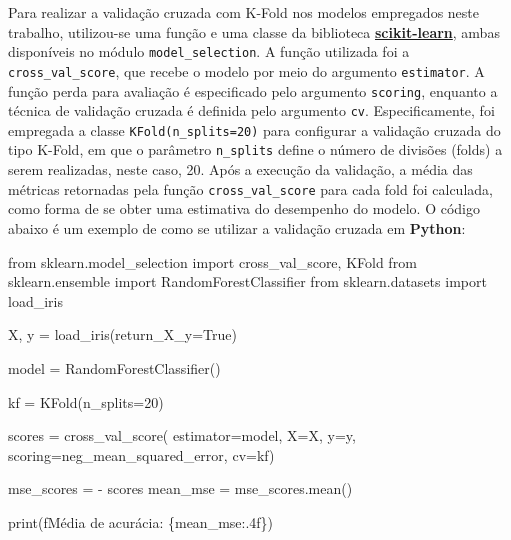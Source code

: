 \documentclass[
  12pt,
  a4paper,
]{scrreprt}
\newenvironment{Shaded}{}{}
\newcommand{\BuiltInTok}[1]{\textcolor[rgb]{0.84,0.23,0.29}{#1}}
\newcommand{\DecValTok}[1]{\textcolor[rgb]{0.00,0.36,0.77}{#1}}
\newcommand{\ImportTok}[1]{\textcolor[rgb]{0.01,0.18,0.38}{#1}}
\newcommand{\NormalTok}[1]{\textcolor[rgb]{0.14,0.16,0.18}{#1}}
\newcommand{\OperatorTok}[1]{\textcolor[rgb]{0.14,0.16,0.18}{#1}}
\newcommand{\SpecialCharTok}[1]{\textcolor[rgb]{0.00,0.36,0.77}{#1}}
\newcommand{\SpecialStringTok}[1]{\textcolor[rgb]{0.01,0.18,0.38}{#1}}
\newcommand{\StringTok}[1]{\textcolor[rgb]{0.01,0.18,0.38}{#1}}
\newcommand{\VariableTok}[1]{\textcolor[rgb]{0.89,0.38,0.04}{#1}}
\begin{document}
\vspace{12pt}

Para realizar a validação cruzada com K-Fold nos modelos empregados
neste trabalho, utilizou-se uma função e uma classe da biblioteca
\href{https://scikit-learn.org/stable/}{\textbf{scikit-learn}}, ambas
disponíveis no módulo \texttt{model\_selection}. A função utilizada foi
a \texttt{cross\_val\_score}, que recebe o modelo por meio do argumento
\texttt{estimator}. A função perda para avaliação é especificado pelo
argumento \texttt{scoring}, enquanto a técnica de validação cruzada é
definida pelo argumento \texttt{cv}. Especificamente, foi empregada a
classe \texttt{KFold(n\_splits=20)} para configurar a validação cruzada
do tipo K-Fold, em que o parâmetro \texttt{n\_splits} define o número de
divisões (folds) a serem realizadas, neste caso, 20. Após a execução da
validação, a média das métricas retornadas pela função
\texttt{cross\_val\_score} para cada fold foi calculada, como forma de
se obter uma estimativa do desempenho do modelo. O código abaixo é um
exemplo de como se utilizar a validação cruzada em \textbf{Python}:

\begin{Shaded}
\begin{Highlighting}[]
\ImportTok{from}\NormalTok{ sklearn.model\_selection }\ImportTok{import}\NormalTok{ cross\_val\_score, KFold}
\ImportTok{from}\NormalTok{ sklearn.ensemble }\ImportTok{import}\NormalTok{ RandomForestClassifier}
\ImportTok{from}\NormalTok{ sklearn.datasets }\ImportTok{import}\NormalTok{ load\_iris}

\NormalTok{X, y }\OperatorTok{=}\NormalTok{ load\_iris(return\_X\_y}\OperatorTok{=}\VariableTok{True}\NormalTok{)}

\NormalTok{model }\OperatorTok{=}\NormalTok{ RandomForestClassifier()}

\NormalTok{kf }\OperatorTok{=}\NormalTok{ KFold(n\_splits}\OperatorTok{=}\DecValTok{20}\NormalTok{)}

\NormalTok{scores }\OperatorTok{=}\NormalTok{ cross\_val\_score(}
\NormalTok{  estimator}\OperatorTok{=}\NormalTok{model,}
\NormalTok{  X}\OperatorTok{=}\NormalTok{X, y}\OperatorTok{=}\NormalTok{y,}
\NormalTok{  scoring}\OperatorTok{=}\StringTok{\textquotesingle{}neg\_mean\_squared\_error\textquotesingle{}}\NormalTok{,}
\NormalTok{  cv}\OperatorTok{=}\NormalTok{kf)}

\NormalTok{mse\_scores }\OperatorTok{=} \OperatorTok{{-}}\NormalTok{ scores}
\NormalTok{mean\_mse }\OperatorTok{=}\NormalTok{ mse\_scores.mean()}

\BuiltInTok{print}\NormalTok{(}\SpecialStringTok{f\textquotesingle{}Média de acurácia: }\SpecialCharTok{\{}\NormalTok{mean\_mse}\SpecialCharTok{:.4f\}}\SpecialStringTok{\textquotesingle{}}\NormalTok{)}
\end{Highlighting}
\end{Shaded}
\end{document}
